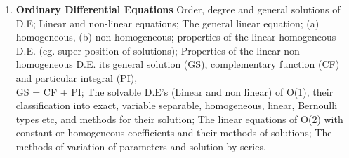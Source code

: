 \documentclass[11pt,a4paper]{article}
\theoremstyle{definition}
\begin{document}
\begin{enumerate}
\item \textbf{Ordinary Differential Equations}
Order, degree and general solutions of D.E; Linear and non-linear equations; The general linear equation; (a) homogeneous, (b) non-homogeneous; properties of the linear homogeneous D.E. (eg. super-position of solutions); Properties of the linear non-homogeneous D.E. its general solution (GS), complementary function (CF) and particular integral (PI),\\ GS = CF + PI; The solvable D.E's (Linear and non linear) of O(1), their classification into exact, variable separable, homogeneous, linear, Bernoulli types etc, and methods for their solution; The linear equations of O(2) with constant or homogeneous coefficients and their methods of solutions; The methods of variation of parameters and solution by series.
\end{enumerate}
\end{document}
